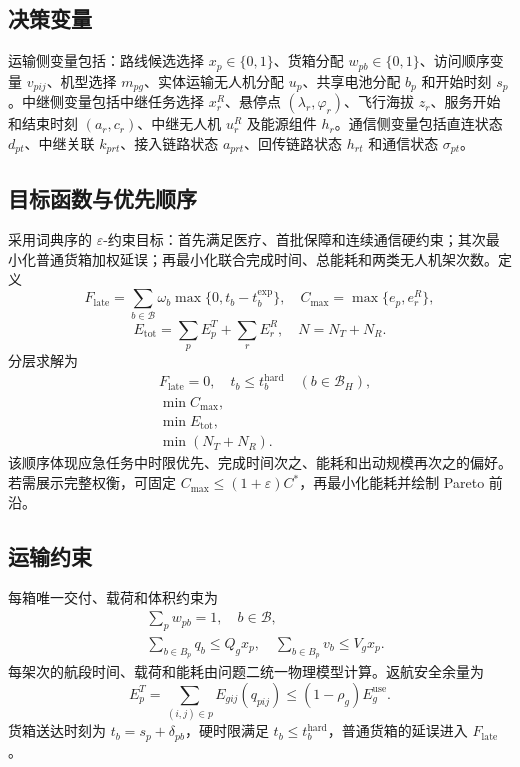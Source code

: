 \documentclass[UTF8,a4paper,12pt]{ctexart}
\begin{document}
\subsection{决策变量}

运输侧变量包括：路线候选选择 $x_p\in\{0,1\}$、货箱分配 $w_{pb}\in\{0,1\}$、访问顺序变量 $v_{pij}$、机型选择 $m_{pg}$、实体运输无人机分配 $u_p$、共享电池分配 $b_p$ 和开始时刻 $s_p$。中继侧变量包括中继任务选择 $x_r^R$、悬停点 $(\lambda_r,\varphi_r)$、飞行海拔 $z_r$、服务开始和结束时刻 $(a_r,c_r)$、中继无人机 $u_r^R$ 及能源组件 $h_r$。通信侧变量包括直连状态 $d_{pt}$、中继关联 $k_{prt}$、接入链路状态 $a_{prt}$、回传链路状态 $h_{rt}$ 和通信状态 $\sigma_{pt}$。

\subsection{目标函数与优先顺序}

采用词典序的 $\varepsilon$-约束目标：首先满足医疗、首批保障和连续通信硬约束；其次最小化普通货箱加权延误；再最小化联合完成时间、总能耗和两类无人机架次数。定义
\begin{equation}
 F_{\mathrm{late}}=\sum_{b\in\mathcal B}\omega_b\max\{0,t_b-t_b^{\mathrm{exp}}\},
\quad C_{\max}=\max\{e_p,e_r^R\},
\end{equation}
\begin{equation}
 E_{\mathrm{tot}}=\sum_p E_p^T+\sum_r E_r^R,
\quad N=N_T+N_R.
\end{equation}
分层求解为
\begin{align}
 &F_{\mathrm{late}}=0,\quad t_b\le t_b^{\mathrm{hard}}\quad(b\in\mathcal B_H),\\
 &\min C_{\max},\\
 &\min E_{\mathrm{tot}},\\
 &\min (N_T+N_R).
\end{align}
该顺序体现应急任务中时限优先、完成时间次之、能耗和出动规模再次之的偏好。若需展示完整权衡，可固定 $C_{\max}\le(1+\varepsilon)C^*$，再最小化能耗并绘制 Pareto 前沿。

\subsection{运输约束}

每箱唯一交付、载荷和体积约束为
\begin{align}
 &\sum_p w_{pb}=1,\quad b\in\mathcal B,\\
 &\sum_{b\in B_p}q_b\le Q_g x_p,\quad \sum_{b\in B_p}v_b\le V_g x_p.
\end{align}
每架次的航段时间、载荷和能耗由问题二统一物理模型计算。返航安全余量为
\begin{equation}
 E_p^T=\sum_{(i,j)\in p}E_{gij}(q_{pij})\le(1-\rho_g)E_g^{\mathrm{use}}.
\end{equation}
货箱送达时刻为 $t_b=s_p+\delta_{pb}$，硬时限满足 $t_b\le t_b^{\mathrm{hard}}$，普通货箱的延误进入 $F_{\mathrm{late}}$。
\end{document}
